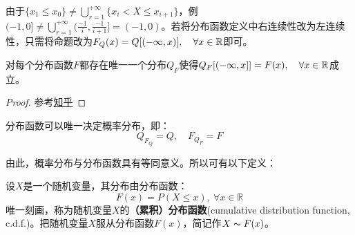 \begin{note}
    由于$\{ x_1 \le x_0 \} \neq \bigcup_{r=1}^{+\infty}\{x_i < X \le x_{i+1}\}$，例$(-1,0]\neq \bigcup_{r=1}^{+\infty}(\frac{-1}{i},\frac{-1}{i+1}]=(-1,0)$。若将分布函数定义中右连续性改为左连续性，只需将命题改为$F_Q(x)=Q[(-\infty,x)], \quad \forall x \in \mathbb{R}$即可。
\end{note}

\begin{proposition}
    对每个分布函数$F$都存在唯一一个分布$Q_F$使得$Q_F[(-\infty,x]]=F(x), \quad \forall x \in \mathbb{R}$成立。
\end{proposition}
\begin{proof}
    参考\href{https://www.zhihu.com/question/23022012/answer/2520636971}{知乎}
\end{proof}

\begin{theorem}
    分布函数可以唯一决定概率分布，即：
    \[ Q_{F_Q}=Q, \quad F_{Q_F}=F \]
\end{theorem}
由此，概率分布与分布函数具有等同意义。所以可有以下定义：
\begin{definition}[随机变量的分布函数]
    设$X$是一个随机变量，其分布由分布函数：
    \[ F(x)=P(X \le x),\ \forall x \in \mathbb{R} \]
    唯一刻画，称为随机变量$X$的\textbf{（累积）分布函数}(cumulative distribution function, c.d.f.)。把随机变量$X$服从分布函数$F(x)$，简记作$X \thicksim F(x)$。
\end{definition}


